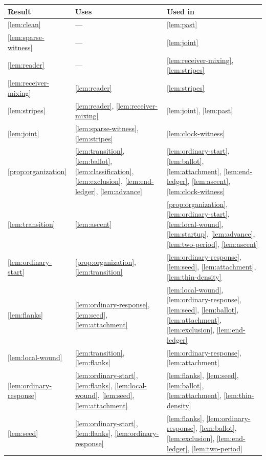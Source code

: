 \begin{longtable}{@{}>{\raggedright\arraybackslash}p{.14\linewidth}>{\raggedright\arraybackslash}p{.40\linewidth}>{\raggedright\arraybackslash}p{.38\linewidth}@{}}
\toprule
Result & Uses & Used in \\
\midrule
\endhead
\ref{lem:clean} & --- & \ref{lem:past} \\
\ref{lem:sparse-witness} & --- & \ref{lem:joint} \\
\ref{lem:reader} & --- & \ref{lem:receiver-mixing}, \ref{lem:stripes} \\
\ref{lem:receiver-mixing} & \ref{lem:reader} & \ref{lem:stripes} \\
\ref{lem:stripes} & \ref{lem:reader}, \ref{lem:receiver-mixing} & \ref{lem:joint}, \ref{lem:past} \\
\ref{lem:joint} & \ref{lem:sparse-witness}, \ref{lem:stripes} & \ref{lem:clock-witness} \\
\ref{prop:organization} & \ref{lem:transition}, \ref{lem:ballot}, \ref{lem:classification}, \ref{lem:exclusion}, \ref{lem:end-ledger}, \ref{lem:advance} & \ref{lem:ordinary-start}, \ref{lem:ballot}, \ref{lem:attachment}, \ref{lem:end-ledger}, \ref{lem:ascent}, \ref{lem:clock-witness} \\
\ref{lem:transition} & \ref{lem:ascent} & \ref{prop:organization}, \ref{lem:ordinary-start}, \ref{lem:local-wound}, \ref{lem:startup}, \ref{lem:advance}, \ref{lem:two-period}, \ref{lem:ascent} \\
\ref{lem:ordinary-start} & \ref{prop:organization}, \ref{lem:transition} & \ref{lem:ordinary-response}, \ref{lem:seed}, \ref{lem:attachment}, \ref{lem:thin-density} \\
\ref{lem:flanks} & \ref{lem:ordinary-response}, \ref{lem:seed}, \ref{lem:attachment} & \ref{lem:local-wound}, \ref{lem:ordinary-response}, \ref{lem:seed}, \ref{lem:ballot}, \ref{lem:attachment}, \ref{lem:exclusion}, \ref{lem:end-ledger} \\
\ref{lem:local-wound} & \ref{lem:transition}, \ref{lem:flanks} & \ref{lem:ordinary-response}, \ref{lem:attachment} \\
\ref{lem:ordinary-response} & \ref{lem:ordinary-start}, \ref{lem:flanks}, \ref{lem:local-wound}, \ref{lem:seed}, \ref{lem:attachment} & \ref{lem:flanks}, \ref{lem:seed}, \ref{lem:ballot}, \ref{lem:attachment}, \ref{lem:thin-density} \\
\ref{lem:seed} & \ref{lem:ordinary-start}, \ref{lem:flanks}, \ref{lem:ordinary-response} & \ref{lem:flanks}, \ref{lem:ordinary-response}, \ref{lem:ballot}, \ref{lem:exclusion}, \ref{lem:end-ledger}, \ref{lem:two-period} \\

\end{longtable}
